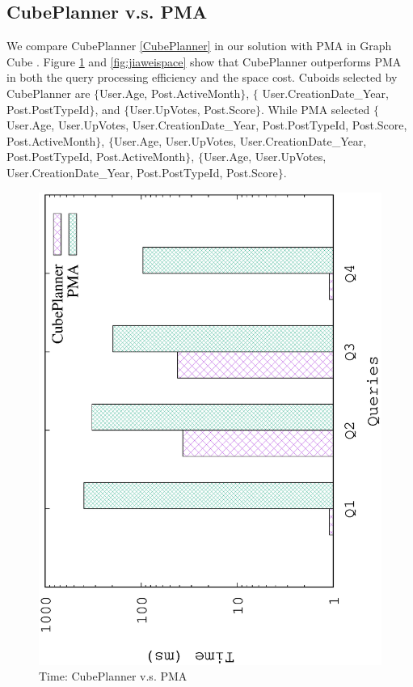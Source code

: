 	\subsection{CubePlanner v.s. PMA}
	\label{CubePlannerPMA}
	We compare CubePlanner \ref{CubePlanner} in our solution with PMA in Graph Cube \cite{DBLP:conf/sigmod/ZhaoLXH11}. Figure \ref{fig:qjiawei} and \ref{fig:jiaweispace} show that CubePlanner outperforms PMA in both the query processing efficiency and the space cost. Cuboids selected by CubePlanner are $\{$User.Age, Post.ActiveMonth$\}$, $\{$ User.CreationDate\_Year, Post.PostTypeId$\}$, and $\{$User.UpVotes, Post.Score$\}$. While PMA selected $\{$User.Age, User.UpVotes, User.CreationDate\_Year, Post.PostTypeId, Post.Score, Post.ActiveMonth$\}$, $\{$User.Age, User.UpVotes, User.CreationDate\_Year, Post.PostTypeId, Post.ActiveMonth$\}$, $\{$User.Age, User.UpVotes, User.CreationDate\_Year, Post.PostTypeId, Post.Score$\}$.


\begin{figure}[H]
	\centering
	\includegraphics[scale=0.5, angle=270]{plot/qjiawei.eps}
	\caption{Time: CubePlanner v.s. PMA}
	\label{fig:qjiawei}
\end{figure}

